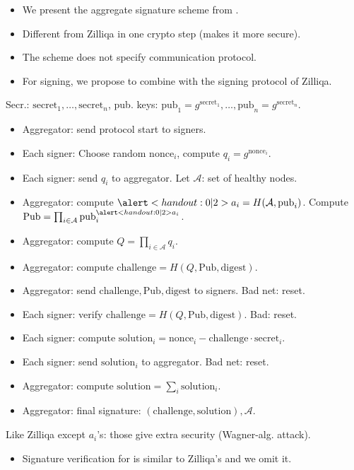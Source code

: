 \begin{frame}
\begin{itemize}
\item We present the aggregate signature scheme from \cite[MPSW18]{cryptoeprintSimpleSchnorrMultisignatures}.
\item Different from Zilliqa in one crypto step (makes it more secure).
\item The scheme does not specify communication protocol.
\item For signing, we propose to combine \cite[MPSW18]{cryptoeprintSimpleSchnorrMultisignatures} with the signing protocol of Zilliqa.



\end{itemize}
\end{frame}

\begin{frame}
Secr.: $\mathrm{secret}_1, \dots, \mathrm{secret}_n$, pub. keys: $\mathrm{pub}_1 = g^{ \mathrm{secret }_1 }, \dots, \mathrm{pub}_n= g^{\mathrm{secret}_n}$.
\begin{emptyTheorem}
\begin{itemize}
\item Aggregator: send protocol start to signers.
\item Each signer: Choose random $\mathrm{nonce}_i$, compute $q_i = g^{\mathrm{nonce}_i}$.
\item Each signer: send $q_i$ to aggregator. Let $\mathcal A$: set of healthy nodes.
\item Aggregator: compute $\alertNoH{2}{a_i= H(\mathcal A, \mathrm{pub}_i)}$. Compute $ \mathrm{Pub} =\prod_{i\in \mathcal A} \mathrm{pub}_i^{\alertNoH{2}{a_i}}$. 
\item Aggregator: compute $Q = \prod_{i \in \mathcal A} q_i$.
\item Aggregator: compute  $\mathrm{challenge} = H(Q, \mathrm{Pub}, \mathrm{digest})$.
\item Aggregator: send $\mathrm{challenge},\mathrm{Pub}, \mathrm{digest}$ to signers. Bad net: reset.
\item Each signer: verify $\mathrm{challenge} = H(Q, \mathrm {Pub}, \mathrm{digest}) $. Bad: reset.
\item Each signer: compute $\mathrm{solution}_i = {\mathrm{nonce}_i - \mathrm{challenge} \cdot \mathrm{secret}_i} $.
\item Each signer: send $\mathrm{solution}_i$ to aggregator. Bad net: reset.
\item Aggregator: compute $\mathrm{solution} = \sum_i \mathrm{solution}_i $.
\item Aggregator: final signature: $(\mathrm{challenge}, \mathrm{solution}), \mathcal A$.
\end{itemize}
\end{emptyTheorem}
\vskip -0.15cm
Like Zilliqa except $a_i$'s: those give extra security (Wagner-alg. attack).

\vskip 15cm

\end{frame}

\begin{frame}
\begin{itemize}
\item Signature verification for \cite{cryptoeprintSimpleSchnorrMultisignatures} is similar to Zilliqa's and we omit it.
\end{itemize}
\end{frame}


